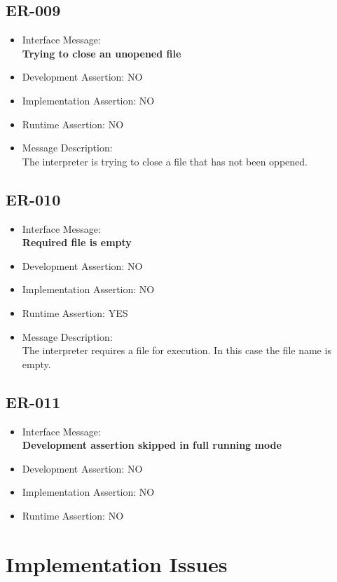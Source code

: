 \subsection{ER-009}
\begin{itemize}
  \item Interface Message:\\[1em]
    \textbf{Trying to close an unopened file}
  \item Development Assertion: NO
  \item Implementation Assertion: NO
  \item Runtime Assertion: NO
  \item Message Description:\\[1em]
    The interpreter is trying to close a file that has not been oppened.
\end{itemize}

\subsection{ER-010}
\begin{itemize}
  \item Interface Message:\\[1em]
    \textbf{Required file is empty}
  \item Development Assertion: NO
  \item Implementation Assertion: NO
  \item Runtime Assertion: YES
  \item Message Description:\\[1em]
    The interpreter requires a file for execution. In this case the file name is empty.
\end{itemize}

\subsection{ER-011}
\begin{itemize}
  \item Interface Message:\\[1em]
    \textbf{Development assertion skipped in full running mode}
  \item Development Assertion: NO
  \item Implementation Assertion: NO
  \item Runtime Assertion: NO
\end{itemize}

\section{Implementation Issues}

